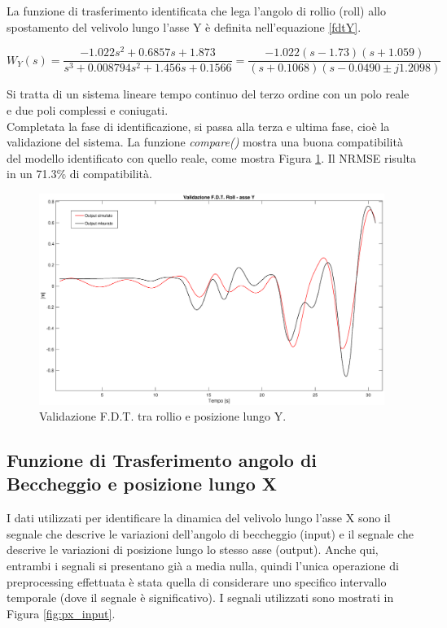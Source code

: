 La funzione di trasferimento identificata che lega l'angolo di rollio (roll) allo spostamento del velivolo lungo l'asse Y è definita nell'equazione \ref{fdtY}.

\begin{equation}
	W_Y(s) = \frac{-1.022s^2 + 0.6857s + 1.873}{s^3 + 0.008794s^2 + 1.456s + 0.1566}
	= \frac{-1.022(s-1.73)(s+1.059)}{(s+0.1068)(s-0.0490\pm j1.2098)}
	\label{fdtY}
\end{equation}

Si tratta di un sistema lineare tempo continuo del terzo ordine con un polo reale e due poli complessi e coniugati.\\

Completata la fase di identificazione, si passa alla terza e ultima fase, cioè la validazione del sistema. La funzione \emph{compare()} \cite{compare} mostra una buona compatibilità del modello identificato con quello reale, come mostra Figura \ref{fig:ry_model}. Il \acs{NRMSE} risulta in un 71.3\% di compatibilità.

\begin{figure}[H]
	\centering
	\includegraphics[width=1\textwidth]{gfx/SysId/rymodel}
	\caption[Validazione F.D.T. Rollio e posizione lungo Y.]{Validazione F.D.T. tra rollio e posizione lungo Y.}
	\label{fig:ry_model}
\end{figure}

\subsection{Funzione di Trasferimento angolo di Beccheggio e posizione lungo X}
I dati utilizzati per identificare la dinamica del velivolo lungo l'asse X sono il segnale che descrive le variazioni dell'angolo di beccheggio (input) e il segnale che descrive le variazioni di posizione lungo lo stesso asse (output). Anche qui, entrambi i segnali si presentano già a media nulla, quindi l'unica operazione di preprocessing effettuata è stata quella di considerare uno specifico intervallo temporale (dove il segnale è significativo). I segnali utilizzati sono mostrati in Figura \ref{fig:px_input}.

